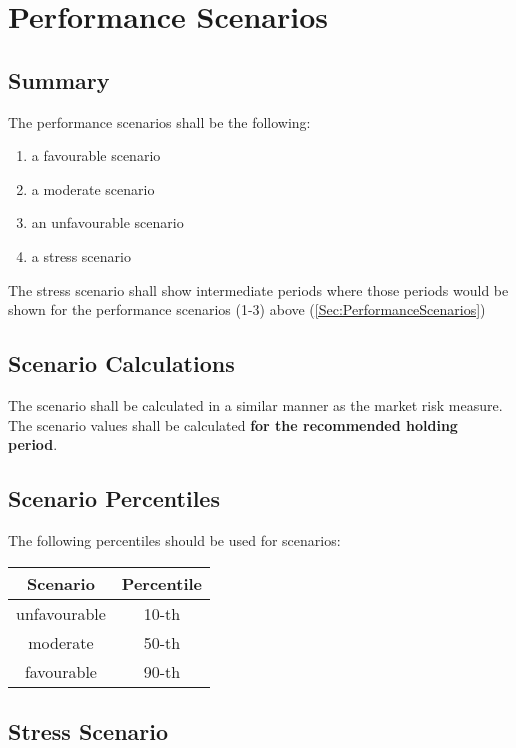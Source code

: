 \chapter{Performance Scenarios}

\section{Summary}
The performance scenarios shall be the following:
\begin{enumerate}
	\label{Sec:PerformanceScenarios}
	\item a favourable scenario
	\item a moderate scenario
	\item an unfavourable scenario
	\item a stress scenario
\end{enumerate}
The stress scenario shall show intermediate periods where those periods would be shown for the performance scenarios (1-3) above (\ref{Sec:PerformanceScenarios})

\section{Scenario Calculations}
The scenario shall be calculated in a similar manner as the market risk measure.\\
The scenario values shall be calculated \textbf{\color{blue}for the recommended holding period}.

\section{Scenario Percentiles}
The following percentiles should be used for scenarios:
\begin{center}
	\begin{longtable}{| c | c |}
		\hline
		\textbf{Scenario} & \textbf{Percentile}\\
		\hline
		unfavourable & 10-th\\
		\hline
		moderate & 50-th\\
		\hline
		favourable & 90-th\\
		\hline
	\end{longtable}
\end{center}

\section{Stress Scenario}
\label{Sec:StressScenario}

